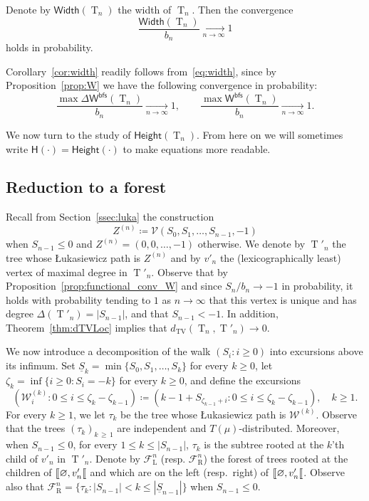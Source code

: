 \documentclass[10pt]{amsart}
\theoremstyle{definition}\newtheorem{defi}[theo]{Definition}\newtheorem{rema}[theo]{Remark}\newtheorem{exam}[theo]{Example}\newtheorem{exem}[theo]{Example}\newtheorem{nota}[theo]{Notation}
\newcommand*\W{\mathsf{W}}
\renewcommand{\H}{\mathsf{Height}}
\newcommand{\height}{\mathsf{H}}
\newcommand{\bfs}{\mathsf{bfs}}
\newcommand{\Width}{\mathsf{Width}}
\DeclareMathOperator{\rtree}{T}
\DeclareMathOperator{\TV}{TV}
\DeclareMathOperator{\rmL}{L}
\DeclareMathOperator{\rmR}{R}
\newcommand{\cF}{\mathcal{F}}
\newcommand{\cV}{\mathcal{V}}
\newcommand{\cW}{\mathcal{W}}
\newcommand{\llbracket}{\mathopen{[\mkern -2.7mu[}}
\begin{document}
\begin{coro}\label{cor:width}
Denote by $\Width(\rtree_{n})$ the width of $ \rtree_{ n}$. Then the convergence
\[
\frac{\Width(\rtree_{n})}{b_n}  \xrightarrow[n\to\infty]{}  1
\]
holds in probability.
\end{coro}

Corollary~\ref{cor:width} readily follows from~\eqref{eq:width}, since by Proposition~\ref{prop:W} we have the following convergence in probability:
\[
\frac{\max\Delta\W^{\bfs}(\rtree_{n}) }{ b_{n} }  \xrightarrow[n\to\infty]{}  1, \qquad \frac{\max \W^{\bfs}(\rtree_{n})}{ b_{n} }  \xrightarrow[n\to\infty]{}  1.
\]


We now turn to the study of $\H(\rtree_{n})$. From here on we will sometimes write $\height(\cdot)=\H(\cdot)$ to make equations more readable.

\subsection{Reduction to a forest}\label{ssec:forest}
Recall from Section~\ref{ssec:luka} the construction
\[
Z^{(n)} \coloneqq \cV(S_0,S_1,\ldots,S_{n-1},-1)
\]
when $S_{n-1} \le 0$ and $Z^{(n)}=(0,0, \ldots,-1)$ otherwise. We denote by $ \rtree'_{n}$ the tree whose {\L}ukasiewicz path is $Z^{(n)}$ and by $v'_n$ the (lexicographically least) vertex of maximal degree in $\rtree'_{ n}$. Observe that by Proposition~\ref{prop:functional_conv_W} and since $S_{n}/b_{n} \rightarrow -1$ in probability, it holds with probability tending to $1$ as $n \rightarrow \infty$ that this vertex is unique and has degree $\Delta(\rtree'_{ n})= \vert S_{n-1} \vert$, and that $S_{n-1}<-1$. In addition, Theorem~\ref{thm:dTVLoc} implies that $d_{\TV}(\rtree_{n},\rtree'_{n}) \rightarrow 0$.

We now introduce a decomposition of the walk $(S_i : i \geq 0)$ into excursions above its infimum. Set $\underline{S}_{k} = \min \{S_{0}, S_{1}, \ldots,S_{k}\}$ for every $k \geq 0$, let $\zeta_{k}=\inf\{i\geq 0 : S_i=-k\}$ for every $k\geq 0$, and define the excursions
\[
\left(\cW^{(k)}_i : 0 \leq i \leq \zeta_{k}-\zeta_{k-1} \right) \coloneqq \left(k-1+S_{\zeta_{k-1}+i} : 0 \leq i \leq \zeta_{k}-\zeta_{k-1} \right), \quad k\geq 1.
\]
For every $k\geq 1$, we let $\tau_k$ be the tree whose {\L}ukasiewicz path is $\cW^{(k)}$. Observe that the trees $(\tau_k)_{k\,\ge\,1}$ are independent and $T(\mu)$-distributed. Moreover, when $S_{n-1} \leq 0$, for every $1\leq k \leq \vert S_{n-1}\vert$, $\tau_k$ is the subtree rooted at the $k$'th child of $v'_n$ in $\rtree'_{n}$. Denote by $ \cF^{n}_{\rmL}$ (resp. $ \cF^{n}_{\rmR}$) the forest of trees rooted at the children of $\llbracket \varnothing, v'_{n} \llbracket$ and which are on the left (resp.\ right) of $\llbracket \varnothing, v'_{n} \llbracket$. Observe also that $ \cF^{n}_{\rmR} = \{ \tau_k : |S_{n-1}|<k \leq |\underline{S}_{n-1}| \} $ when $S_{n-1} \leq 0$.
\end{document}
